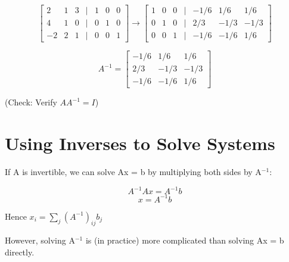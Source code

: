 \documentclass[12pt,a4paper]{article}
\begin{document}
\[
\begin{bmatrix}
2 & 1 & 3 & | & 1 & 0 & 0 \\
4 & 1 & 0 & | & 0 & 1 & 0 \\
-2 & 2 & 1 & | & 0 & 0 & 1
\end{bmatrix} \rightarrow
\begin{bmatrix}
1 & 0 & 0 & | & -1/6 & 1/6 & 1/6 \\
0 & 1 & 0 & | & 2/3 & -1/3 & -1/3 \\
0 & 0 & 1 & | & -1/6 & -1/6 & 1/6
\end{bmatrix}
\]

\[A^{-1} = \begin{bmatrix} -1/6 & 1/6 & 1/6 \\ 2/3 & -1/3 & -1/3 \\ -1/6 & -1/6 & 1/6 \end{bmatrix}\]

(Check: Verify $AA^{-1} = I$)

\section{Using Inverses to Solve Systems}

If A is invertible, we can solve Ax = b by multiplying both sides by A$^{-1}$:

\[A^{-1}Ax = A^{-1}b\]
\[x = A^{-1}b\]

Hence $x_i = \sum_j (A^{-1})_{ij} b_j$

However, solving A$^{-1}$ is (in practice) more complicated than solving Ax = b directly.
\end{document}
